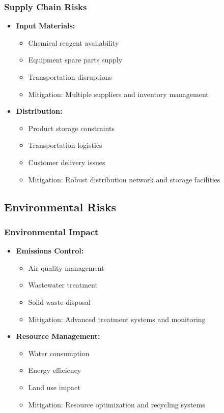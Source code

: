 \subsubsection{Supply Chain Risks}
\begin{itemize}
    \item \textbf{Input Materials:}
    \begin{itemize}
        \item Chemical reagent availability
        \item Equipment spare parts supply
        \item Transportation disruptions
        \item Mitigation: Multiple suppliers and inventory management
    \end{itemize}
    
    \item \textbf{Distribution:}
    \begin{itemize}
        \item Product storage constraints
        \item Transportation logistics
        \item Customer delivery issues
        \item Mitigation: Robust distribution network and storage facilities
    \end{itemize}
\end{itemize}

\subsection{Environmental Risks}

\subsubsection{Environmental Impact}
\begin{itemize}
    \item \textbf{Emissions Control:}
    \begin{itemize}
        \item Air quality management
        \item Wastewater treatment
        \item Solid waste disposal
        \item Mitigation: Advanced treatment systems and monitoring
    \end{itemize}
    
    \item \textbf{Resource Management:}
    \begin{itemize}
        \item Water consumption
        \item Energy efficiency
        \item Land use impact
        \item Mitigation: Resource optimization and recycling systems
    \end{itemize}
\end{itemize}

